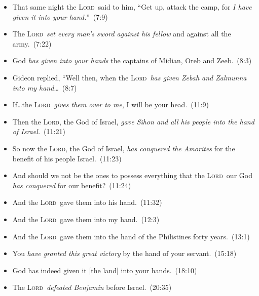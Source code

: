 \documentclass{article}
\newcommand{\Lord}{\textsc{Lord}}
\newcommand{\elips}{\thinspace\ldots}
\begin{document}
\begin{landscape}
\begin{multicols}{3}
\begin{itemize}
  \item That same night the \Lord\ said to him, “Get up, attack the camp, for \emph{I have given it into your hand.}”~(7:9)
  \item The \Lord\ \emph{set every man’s sword against his fellow} and against all the army.~(7:22)
  \item God \emph{has given into your hands} the captains of Midian, Oreb and Zeeb.~(8:3)
  \item Gideon replied, “Well then, when the \Lord\ \emph{has given Zebah and Zalmunna into my hand}\elips~(8:7)
  \item If\elips the \Lord\ \emph{gives them over to me}, I will be your head.~(11:9)
  \item Then the \Lord, the God of Israel, \emph{gave Sihon and all his people into the hand of Israel.}~(11:21)
  \item So now the \Lord, the God of Israel, \emph{has conquered the Amorites} for the benefit of his people Israel.~(11:23)
  \item And should we not be the ones to possess everything that the \Lord\ our God \emph{has conquered} for our benefit?~(11:24)
  \item And the \Lord\ gave them into his hand.~(11:32)
  \item And the \Lord\ gave them into my hand.~(12:3)
  \item And the \Lord\ gave them into the hand of the Philistines forty years.~(13:1)
  \item You \emph{have granted this great victory} by the hand of your servant.~(15:18)
  \item God has indeed given it [the land] into your hands.~(18:10)
  \item The \Lord\ \emph{defeated Benjamin} before Israel.~(20:35)
\end{itemize}


\end{multicols}
\end{landscape}
\end{document}
